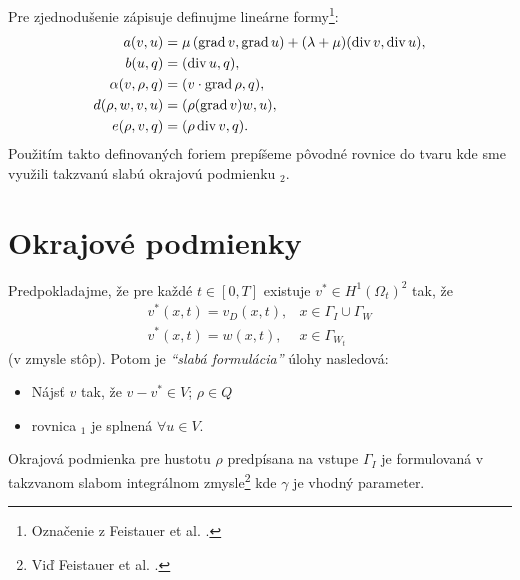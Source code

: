 Pre zjednodušenie zápisuje definujme lineárne formy\footnote{Označenie z
Feistauer et al. \cite[s. 368]{feistauer}.}: 
\[
\begin{split}
a(v,u) &= \mu\,(\mbox{grad}\,v,\mbox{grad}\,u) + (\lambda+\mu)(\mbox{div}\,v,\mbox{div}\,u), \\
b(u,q) &= (\mbox{div}\,u,q), \\
\alpha(v,\rho,q) &= (v \cdot \mbox{grad}\,\rho,q), \\
d(\rho,w,v,u) &= (\rho(\mbox{grad}\,v)w,u), \\
e(\rho,v,q) &= (\rho\,\mbox{div}\,v,q). \\
\end{split}
\]
Použitím takto definovaných foriem prepíšeme pôvodné rovnice do tvaru
kde sme využili takzvanú slabú okrajovú podmienku $_2$.

\section{Okrajové podmienky}

Predpokladajme, že pre každé $t\in[0,T]$ existuje $v^* \in H^1(\Omega_t)^2$
tak, že
\[
\begin{array}{ll}
v^*(x,t)=v_D(x,t), &x \in \Gamma_I \cup \Gamma_W \\
v^*(x,t)=w(x,t), &x \in \Gamma_{W_t}
\end{array}
\]
(v zmysle stôp). Potom je {\it ``slabá formulácia''} úlohy nasledová:\\
\begin{itemize}
 \item Nájsť $v$ tak, že $v - v^* \in V$; $\rho \in Q$
 \item rovnica $_1$ je splnená $\forall u \in V$. 
\end{itemize}

Okrajová podmienka pre hustotu $\rho$ predpísana na vstupe $\Gamma_I$ je
formulovaná v takzvanom slabom integrálnom zmysle\footnote{Viď Feistauer et al.
\cite[s. 373]{feistauer}.} 
kde $\gamma$ je vhodný parameter.

